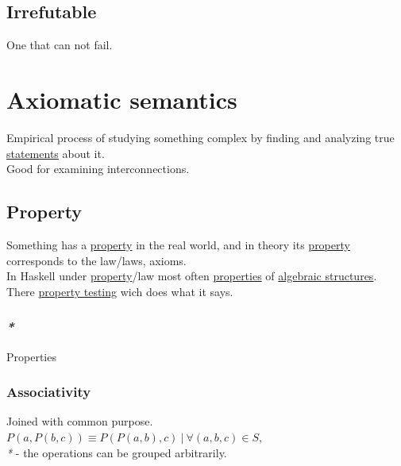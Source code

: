 \documentclass[a4paper,14pt,oneside]{book}
\begin{document}
\subsection{\label{orgf19b8c1}Irrefutable}
\label{sec:orgc2b70be}
One that can not fail.\\

\section{\label{orgd9a0e3b}Axiomatic semantics}
\label{sec:org7a0e6f3}
Empirical process of studying something complex by finding and analyzing true \hyperref[orga943f4a]{statements} about it.\\

Good for examining interconnections.\\

\subsection{\label{org49b84ac}Property}
\label{sec:org144cd32}
Something has a \hyperref[org49b84ac]{property} in the real world, and in theory its \hyperref[org49b84ac]{property} corresponds to the law/laws, axioms.\\

In Haskell under \hyperref[org49b84ac]{property}/law most often \hyperref[orge0a1a8a]{properties} of \hyperref[org011ad83]{algebraic structures}.\\

There \hyperref[org94c5df3]{property testing} wich does what it says.\\

\subsubsection{\emph{*}}
\label{sec:org475d0ca}

\label{orge0a1a8a}Properties\\

\subsubsection{\label{orga16966e}Associativity}
\label{sec:orge06543b}
Joined with common purpose.\\

\(P(a,P(b,c)) \equiv P(P(a,b),c) \ | \ \forall (a,b,c) \in S\),\\

\emph{*} - the operations can be grouped arbitrarily.\\
\end{document}
